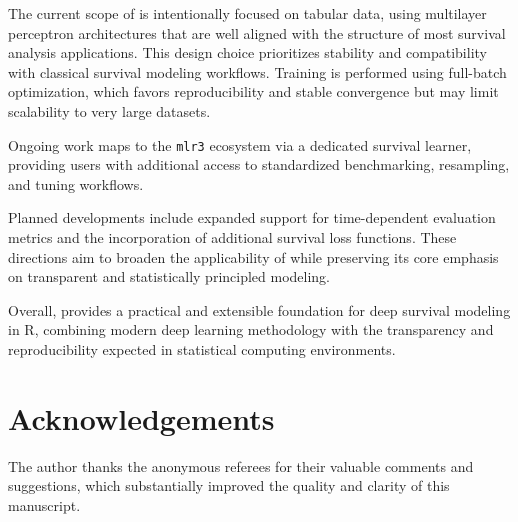 The current scope of  is intentionally focused on tabular data, using multilayer perceptron architectures \citep{bengio2021deep} that are well aligned with the structure of most survival analysis applications. This design choice prioritizes stability and compatibility with classical survival modeling workflows. Training is performed using full-batch optimization, which favors reproducibility and stable convergence but may limit scalability to very large datasets.

Ongoing work maps  to the \texttt{mlr3} ecosystem \citep{mlr3} via a dedicated survival learner, providing users with additional access to standardized benchmarking, resampling, and tuning workflows.

Planned developments include expanded support for time-dependent evaluation metrics \citep{uno2007evaluating, blanche2013estimating} and the incorporation of additional survival loss functions. These directions aim to broaden the applicability of  while preserving its core emphasis on transparent and statistically principled modeling.

Overall,  provides a practical and extensible foundation for deep survival modeling in R, combining modern deep learning methodology with the transparency and reproducibility expected in statistical computing environments.

\section{Acknowledgements}\label{acknowledgements}

The author thanks the anonymous referees for their valuable comments and suggestions, which substantially improved the quality and clarity of this manuscript.



\address{%
Imad El Badisy\\
AI and Data Science Service, Mohammed VI Center for Research and Innovation (CM6RI)\\%
Rabat, Morocco\\
%
%
\textit{ORCiD: \href{https://orcid.org/0000-0003-4848-4895}{0000-0003-4848-4895}}\\%
\href{mailto:elbadisyimad@gmail.com}{\nolinkurl{elbadisyimad@gmail.com}}%
}
